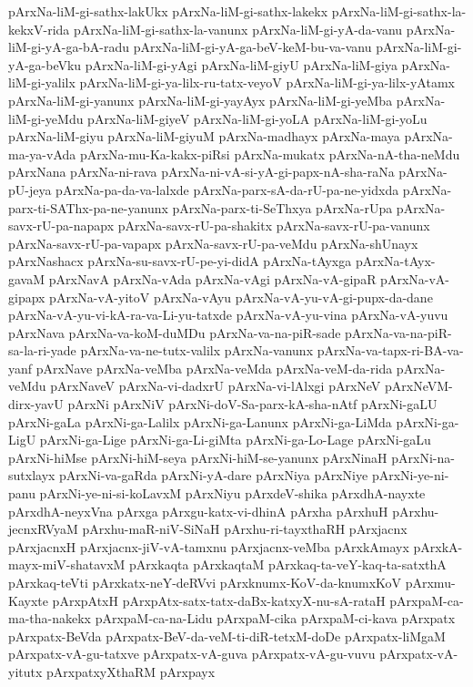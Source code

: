 {pArxNa-liM-gi-sathx-lakUkx
pArxNa-liM-gi-sathx-lakekx
pArxNa-liM-gi-sathx-la-kekxV-rida
pArxNa-liM-gi-sathx-la-vanunx
pArxNa-liM-gi-yA-da-vanu
pArxNa-liM-gi-yA-ga-bA-radu
pArxNa-liM-gi-yA-ga-beV-keM-bu-va-vanu
pArxNa-liM-gi-yA-ga-beVku
pArxNa-liM-gi-yAgi
pArxNa-liM-giyU
pArxNa-liM-giya
pArxNa-liM-gi-yalilx
pArxNa-liM-gi-ya-lilx-ru-tatx-veyoV
pArxNa-liM-gi-ya-lilx-yAtamx
pArxNa-liM-gi-yanunx
pArxNa-liM-gi-yayAyx
pArxNa-liM-gi-yeMba
pArxNa-liM-gi-yeMdu
pArxNa-liM-giyeV
pArxNa-liM-gi-yoLA
pArxNa-liM-gi-yoLu
pArxNa-liM-giyu
pArxNa-liM-giyuM
pArxNa-madhayx
pArxNa-maya
pArxNa-ma-ya-vAda
pArxNa-mu-Ka-kakx-piRsi
pArxNa-mukatx
pArxNa-nA-tha-neMdu
pArxNana
pArxNa-ni-rava
pArxNa-ni-vA-si-yA-gi-papx-nA-sha-raNa
pArxNa-pU-jeya
pArxNa-pa-da-va-lalxde
pArxNa-parx-sA-da-rU-pa-ne-yidxda
pArxNa-parx-ti-SAThx-pa-ne-yanunx
pArxNa-parx-ti-SeThxya
pArxNa-rUpa
pArxNa-savx-rU-pa-napapx
pArxNa-savx-rU-pa-shakitx
pArxNa-savx-rU-pa-vanunx
pArxNa-savx-rU-pa-vapapx
pArxNa-savx-rU-pa-veMdu
pArxNa-shUnayx
pArxNashacx
pArxNa-su-savx-rU-pe-yi-didA
pArxNa-tAyxga
pArxNa-tAyx-gavaM
pArxNavA
pArxNa-vAda
pArxNa-vAgi
pArxNa-vA-gipaR
pArxNa-vA-gipapx
pArxNa-vA-yitoV
pArxNa-vAyu
pArxNa-vA-yu-vA-gi-pupx-da-dane
pArxNa-vA-yu-vi-kA-ra-va-Li-yu-tatxde
pArxNa-vA-yu-vina
pArxNa-vA-yuvu
pArxNava
pArxNa-va-koM-duMDu
pArxNa-va-na-piR-sade
pArxNa-va-na-piR-sa-la-ri-yade
pArxNa-va-ne-tutx-valilx
pArxNa-vanunx
pArxNa-va-tapx-ri-BA-va-yanf
pArxNave
pArxNa-veMba
pArxNa-veMda
pArxNa-veM-da-rida
pArxNa-veMdu
pArxNaveV
pArxNa-vi-dadxrU
pArxNa-vi-lAlxgi
pArxNeV
pArxNeVM-dirx-yavU
pArxNi
pArxNiV
pArxNi-doV-Sa-parx-kA-sha-nAtf
pArxNi-gaLU
pArxNi-gaLa
pArxNi-ga-Lalilx
pArxNi-ga-Lanunx
pArxNi-ga-LiMda
pArxNi-ga-LigU
pArxNi-ga-Lige
pArxNi-ga-Li-giMta
pArxNi-ga-Lo-Lage
pArxNi-gaLu
pArxNi-hiMse
pArxNi-hiM-seya
pArxNi-hiM-se-yanunx
pArxNinaH
pArxNi-na-sutxlayx
pArxNi-va-gaRda
pArxNi-yA-dare
pArxNiya
pArxNiye
pArxNi-ye-ni-panu
pArxNi-ye-ni-si-koLavxM
pArxNiyu
pArxdeV-shika
pArxdhA-nayxte
pArxdhA-neyxVna
pArxga
pArxgu-katx-vi-dhinA
pArxha
pArxhuH
pArxhu-jecnxRVyaM
pArxhu-maR-niV-SiNaH
pArxhu-ri-tayxthaRH
pArxjacnx
pArxjacnxH
pArxjacnx-jiV-vA-tamxnu
pArxjacnx-veMba
pArxkAmayx
pArxkA-mayx-miV-shatavxM
pArxkaqta
pArxkaqtaM
pArxkaq-ta-veY-kaq-ta-satxthA
pArxkaq-teVti
pArxkatx-neY-deRVvi
pArxknumx-KoV-da-knumxKoV
pArxmu-Kayxte
pArxpAtxH
pArxpAtx-satx-tatx-daBx-katxyX-nu-sA-rataH
pArxpaM-ca-ma-tha-nakekx
pArxpaM-ca-na-Lidu
pArxpaM-cika
pArxpaM-ci-kava
pArxpatx
pArxpatx-BeVda
pArxpatx-BeV-da-veM-ti-diR-tetxM-doDe
pArxpatx-liMgaM
pArxpatx-vA-gu-tatxve
pArxpatx-vA-guva
pArxpatx-vA-gu-vuvu
pArxpatx-vA-yitutx
pArxpatxyXthaRM
pArxpayx
}
